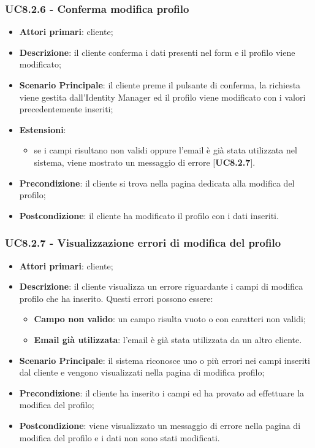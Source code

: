 \subsubsection{UC8.2.6 - Conferma modifica profilo}
\begin{itemize}
\item \textbf{Attori primari}: cliente;
\item \textbf{Descrizione}: il cliente conferma i dati presenti nel form e il profilo viene modificato;
\item \textbf{Scenario Principale}: il cliente preme il pulsante di conferma, la richiesta viene gestita dall'Identity Manager ed il profilo viene modificato con i valori precedentemente inseriti;
\item \textbf{Estensioni}: 
\begin{itemize}
\item se i campi risultano non validi oppure l'email è già stata utilizzata nel sistema, viene mostrato un messaggio di errore [\textbf{UC8.2.7}].
\end{itemize}
\item \textbf{Precondizione}: il cliente si trova nella pagina dedicata alla modifica del profilo;
\item \textbf{Postcondizione}: il cliente ha modificato il profilo con i dati inseriti.
\end{itemize}

\subsubsection{UC8.2.7 - Visualizzazione errori di modifica del profilo}
\begin{itemize}
\item \textbf{Attori primari}: cliente;
\item \textbf{Descrizione}: il cliente visualizza un errore riguardante i campi di modifica profilo che ha inserito. Questi errori possono essere:
\begin{itemize}
\item \textbf{Campo non valido}: un campo risulta vuoto o con caratteri non validi;
\item \textbf{Email già utilizzata}: l'email è già stata utilizzata da un altro cliente.
\end{itemize}
\item \textbf{Scenario Principale}: il sistema riconosce uno o più errori nei campi inseriti dal cliente e vengono visualizzati nella pagina di modifica profilo;
\item \textbf{Precondizione}: il cliente ha inserito i campi ed ha provato ad effettuare la modifica del profilo;
\item \textbf{Postcondizione}: viene visualizzato un messaggio di errore nella pagina di modifica del profilo e i dati non sono stati modificati.
\end{itemize}

